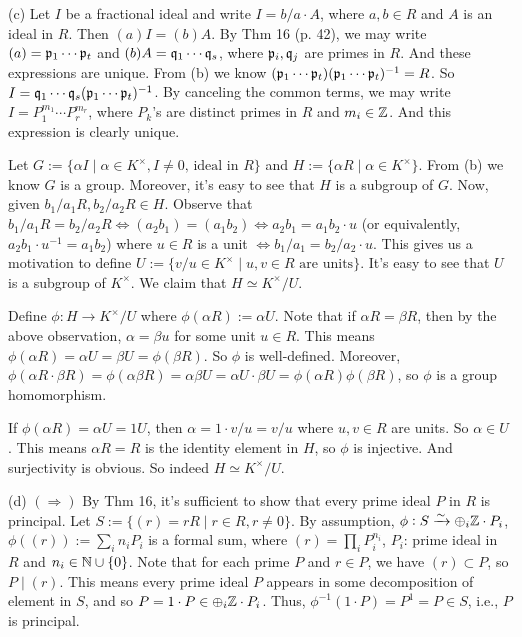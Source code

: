 \documentclass[../Marcus.tex]{subfiles}
\begin{document}
(c) Let $I$ be a fractional ideal and write $I=b/a\cdot A$, where $a,b\in R$ and $A$ is an ideal in $R$. Then $(a)I=(b)A$. By Thm 16 (p. 42), we may write $(a)=\mathfrak{p}_1\cdots\mathfrak{p}_t$ and $(b)A=\mathfrak{q}_1\cdots\mathfrak{q}_s$, where $\mathfrak{p}_i,\mathfrak{q}_j$ are primes in $R$. And these expressions are unique. From (b) we know $(\mathfrak{p}_1\cdots\mathfrak{p}_t)(\mathfrak{p}_1\cdots\mathfrak{p}_t)^{-1}=R$. So $I=\mathfrak{q}_1\cdots\mathfrak{q}_s(\mathfrak{p}_1\cdots\mathfrak{p}_t)^{-1}$. By canceling the common terms, we may write $I=P_1^{m_1}\cdots P_r^{m_r}$, where $P_k$'s are distinct primes in $R$ and $m_i\in\mathbb{Z}$. And this expression is clearly unique.

Let $G:=\{\alpha I\mid \alpha\in K^\times, I\neq 0\text{, ideal in } R\}$ and $H:=\{\alpha R\mid \alpha\in K^\times\}$. From (b) we know $G$ is a group. Moreover, it's easy to see that $H$ is a subgroup of $G$. Now, given $b_1/a_1R, b_2/a_2R\in H$. Observe that $b_1/a_1R=b_2/a_2R \iff (a_2b_1)=(a_1b_2) \iff a_2b_1=a_1b_2\cdot u$ (or equivalently, $a_2b_1\cdot u^{-1}=a_1b_2$) where $u\in R$ is a unit $\iff b_1/a_1=b_2/a_2\cdot u$. This gives us a motivation to define $U:=\{v/u\in K^\times\mid u,v\in R\text{ are units}\}$. It's easy to see that $U$ is a subgroup of $K^\times$. We claim that $H\simeq K^\times/U$.

Define $\phi:H\to K^\times/U$ where $\phi(\alpha R):=\alpha U$. Note that if $\alpha R=\beta R$, then by the above observation, $\alpha=\beta u$ for some unit $u\in R$. This means $\phi(\alpha R)=\alpha U=\beta U=\phi(\beta R)$. So $\phi$ is well-defined. Moreover, $\phi(\alpha R\cdot \beta R)=\phi(\alpha\beta R)=\alpha\beta U=\alpha U\cdot \beta U=\phi(\alpha R)\phi(\beta R)$, so $\phi$ is a group homomorphism.

If $\phi(\alpha R)=\alpha U=1U$, then $\alpha=1\cdot v/u=v/u$ where $u,v\in R$ are units. So $\alpha\in U$. This means $\alpha R=R$ is the identity element in $H$, so $\phi$ is injective. And surjectivity is obvious. So indeed $H\simeq K^\times/U$.

(d) $(\Rightarrow)$ By Thm 16, it's sufficient to show that every prime ideal $P$ in $R$ is principal. Let $S:=\{(r)=rR\mid r\in R,r\neq 0\}$. By assumption, $\phi:S\xrightarrow{\sim} \oplus_{i} \mathbb{Z}\cdot P_i$, $\phi((r)):=\sum_i n_iP_i$ is a formal sum, where $(r)=\prod_i P_i^{n_i}$, $P_i$: prime ideal in $R$ and $n_i\in\mathbb{N}\cup\{0\}$. Note that for each prime $P$ and $r\in P$, we have $(r)\subset P$, so $P\mid (r)$. This means every prime ideal $P$ appears in some decomposition of element in $S$, and so $P=1\cdot P\in \oplus_{i} \mathbb{Z}\cdot P_i$. Thus, $\phi^{-1}(1\cdot P)=P^1=P\in S$, i.e., $P$ is principal.
\end{document}
